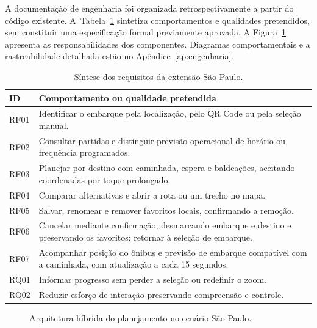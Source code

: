 \documentclass[12pt,oneside,a4paper,brazil,chapter=TITLE]{abntex2}
\begin{document}
A documentação de engenharia foi organizada retrospectivamente a partir do código existente. A~Tabela~\ref{tab:requisitos-pap} sintetiza comportamentos e qualidades pretendidos, sem constituir uma especificação formal previamente aprovada. A Figura~\ref{fig:arquitetura-pap} apresenta as responsabilidades dos componentes. Diagramas comportamentais e a rastreabilidade detalhada estão no Apêndice~\ref{ap:engenharia}.
\begin{table}[H]\centering\small
\caption{Síntese dos requisitos da extensão São Paulo.}\label{tab:requisitos-pap}
\begin{tabular}{p{1.5cm}p{11.5cm}}\hline
ID & Comportamento ou qualidade pretendida\\\hline
RF01 & Identificar o embarque pela localização, pelo QR Code ou pela seleção manual.\\
RF02 & Consultar partidas e distinguir previsão operacional de horário ou frequência programados.\\
RF03 & Planejar por destino com caminhada, espera e baldeações, aceitando coordenadas por toque prolongado.\\
RF04 & Comparar alternativas e abrir a rota ou um trecho no mapa.\\
RF05 & Salvar, renomear e remover favoritos locais, confirmando a remoção.\\
RF06 & Cancelar mediante confirmação, desmarcando embarque e destino e preservando os favoritos; retornar à seleção de embarque.\\
RF07 & Acompanhar posição do ônibus e previsão de embarque compatível com a caminhada, com atualização a cada 15 segundos.\\
RQ01 & Informar progresso sem perder a seleção ou redefinir o zoom.\\
RQ02 & Reduzir esforço de interação preservando compreensão e controle.\\\hline
\end{tabular}
\end{table}

\begin{figure}[H]
\centering\resizebox{\textwidth}{!}{}
\caption{Arquitetura híbrida do planejamento no cenário São Paulo.}\label{fig:arquitetura-pap}
\end{figure}
\end{document}
